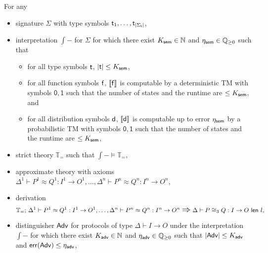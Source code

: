 
\begin{lemma}\label{lem:soundness_congruence_approximate_3}
For any
\begin{itemize}
\item \ipdl signature $\Sigma$ with type symbols $\mathsf{t}_1,\ldots,\mathsf{t}_{|\Sigma_\mathsf{t}|}$,

\item interpretation $\int{-}$ for $\Sigma$ for which there exist $K_{\mathsf{sem}} \in \mathbb{N}$ and $\eta_{\mathsf{sem}} \in \mathbb{Q}_{\geq 0}$ such that
\begin{itemize}
\item for all type symbols $\mathsf{t}$, $|\mathsf{t}| \leq K_{\mathsf{sem}}$,

\item for all function symbols $\mathsf{f}$, $\llbracket \mathsf{f} \rrbracket$ is computable by a deterministic TM with symbols $\mathsf{0}, \mathsf{1}$ such that the number of states and the runtime are $\leq K_{\mathsf{sem}}$, and

\item for all distribution symbols $\mathsf{d}$, $\llbracket \mathsf{d} \rrbracket$ is computable up to error $\eta_{\mathsf{sem}}$ by a probabilistic TM with symbols $\mathsf{0}, \mathsf{1}$ such that the number of states and the runtime are $\leq K_{\mathsf{sem}}$,
\end{itemize}

\item strict \ipdl theory $\mathbb{T}_=$ such that $\int{-} \vDash \mathbb{T}_=$,

\item approximate \ipdl theory with axioms $\Delta^1 \vdash P^1 \approx Q^1 : I^1 \to O^1, \ldots, \Delta^n \vdash P^n \approx Q^n : I^n \to O^n$,

\item derivation \[\mathbb{T}_=; \, \Delta^1 \vdash P^1 \approx Q^1 : I^1 \to O^1, \ldots, \Delta^n \vdash P^n \approx Q^n : I^n \to O^n \; \mathlarger{\mathlarger{\Rightarrow}} \; \Delta \vdash \lapproxcong{P}{Q}{I}{O}{l}{3},\]%

\item distinguisher $\mathsf{Adv}$ for protocols of type $\Delta \vdash I \to O$ under the interpretation $\int{-}$ for which there exist $K_{\mathsf{adv}} \in \mathbb{N}$ and $\eta_{\mathsf{adv}} \in \mathbb{Q}_{\geq 0}$ such that $|\mathsf{Adv}| \leq K_{\mathsf{adv}}$ and $\mathsf{err}(\mathsf{Adv}) \leq \eta_{\mathsf{adv}}$,


\end{itemize}
\end{lemma}
